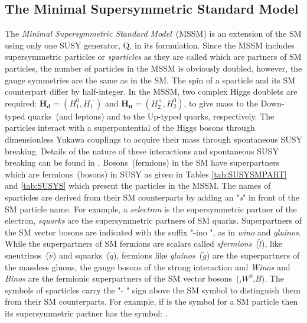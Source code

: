 \subsection{The Minimal Supersymmetric Standard Model}
The \textit{Minimal Supersymmetric Standard Model}~(MSSM) is an extension of the SM using only one SUSY generator, $\mathrm{Q}$, in its formulation. Since the MSSM includes supersymmetric particles or \textit{sparticles} as they are called which are partners of SM particles, the number of particles in the MSSM is obviously doubled, however, the gauge symmetries are the same as in the SM. The spin of a  sparticle and its SM counterpart differ by half-integer.
\newline
In the MSSM, two complex Higgs doublets are required: $ \mathbf{H_{d}} = (H^{0}_{1},H^{-}_{1})$ and $ \mathbf{H_{u}} = (H^{+}_{2},H^{0}_{2})$, to give mass to the \textsf{Down}-typed quarks~(and leptons) and to the  \textsf{Up}-typed quarks, respectively. The particles interact with a superpontential of the Higgs bosons through dimensionless  Yukawa couplings to acquire their mass through spontaneous SUSY breaking. Details of the nature of these interactions and spontaneous SUSY breaking can be found in \cite{MSSM,SUSYM,SUSYN}. 
\newline
Bosons~(fermions) in the SM have superpartners which are fermions~(bosons) in SUSY as given in Tables \ref{tab:SUSYSMPART} and \ref{tab:SUSYS} which present the particles in the MSSM. The names of sparticles are derived from their SM counterparts by adding an "\textit{s}" in front of the SM particle name. For example, a \textit{selectron} is the supersymmetric partner of the electron, \textit{squarks} are the supersymmetric partners of SM quarks. Superpartners of the SM vector bosons are indicated with the suffix "-ino ", as in \textit{wino} and \textit{gluinos}. While the superpartners of SM fermions are scalars called \textit{sfermions}~($\tilde{l}$), like sneutrinos~($\tilde{\nu}$) and squarks~($\tilde{q}$), fermions like \textit{gluinos}~($\tilde{g}$) are the superpartners of the massless  gluons, the gauge bosons of the strong interaction and \textit{Winos} and \textit{Binos} are the  fermionic superpartners  of the SM vector bosons~(\PWpm,$ W^{0}$,$B$). 
\newline
The symbols of sparticles carry the " $\tilde{}$ " sign above the SM symbol to distinguish them from their SM counterparts. For example, if \Pquark is the symbol for a SM particle then its supersymmetric partner has the symbol: \Psquark. 

